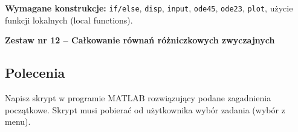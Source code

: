 \documentclass[a4paper,11pt]{article}
\begin{document}
\vspace{0.3cm}
\begin{ramka}
\textbf{Wymagane konstrukcje:}
\texttt{if/else}, \texttt{disp}, \texttt{input}, \texttt{ode45}, \texttt{ode23}, \texttt{plot}, użycie funkcji lokalnych (local functions).
\end{ramka}

\clearpage
\begin{center}
  {\large\bfseries Zestaw nr 12 \quad -- \quad Całkowanie równań różniczkowych zwyczajnych}
\end{center}
\hrulefill
\vspace{0.4cm}

\subsection*{Polecenia}

Napisz skrypt w programie MATLAB rozwiązujący podane zagadnienia początkowe. Skrypt musi pobierać od użytkownika wybór zadania (wybór z menu).
\end{document}
